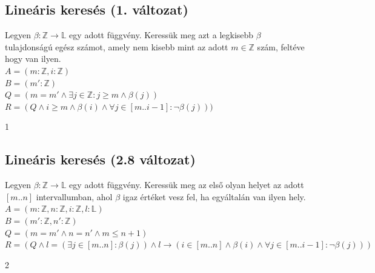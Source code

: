\documentclass[a4paper,12pt]{article}
\newcommand{\lv}{{:}}
\begin{document}
\subsection{Lineáris keresés (1. változat)}
Legyen $\beta\colon \mathbb{Z}\rightarrow\mathbb{L}$ egy adott függvény. Keressük meg azt a legkisebb $\beta$ tulajdonságú egész számot, amely nem kisebb mint az adott $m\in \mathbb{Z}$ szám, feltéve hogy van ilyen.\\

$A = (m\lv\mathbb{Z}, i\lv\mathbb{Z})$\\[2pt]
$B = (m'\lv\mathbb{Z})$\\[2pt]
$Q = (m = m' \land \exists j\in \mathbb{Z}\colon j\geqslant m \land \beta(j))$\\[2pt]
$R = (Q \land i\geqslant m \land \beta(i) \land \forall j \in [m..i-1]\colon \neg\beta(j)))$
\medskip
\begin{stuki}[4cm]
  \begin{WHILE}{1}{}
  \end{WHILE}
\end{stuki}
\bigskip

\subsection{Lineáris keresés (2.8 változat)}
Legyen $\beta\colon \mathbb{Z}\rightarrow\mathbb{L}$ egy adott függvény. Keressük meg az első olyan helyet az adott $[m..n]$ intervallumban, ahol $\beta$ igaz értéket vesz fel, ha egyáltalán van ilyen hely.\\

$A = (m\lv\mathbb{Z}, n\lv\mathbb{Z}, i\lv\mathbb{Z}, l\lv\mathbb{L})$\\[2pt]
$B = (m'\lv\mathbb{Z}, n'\lv\mathbb{Z})$\\[2pt]
$Q = (m = m' \land n = n' \land m \leqslant n+1)$\\[2pt]
$R = (Q \land l = (\exists j\in [m..n]\colon \beta(j)) \land l \rightarrow (i \in [m..n] \land \beta(i) \land \forall j \in [m..i-1]\colon \neg\beta(j)))$
\medskip
\begin{stuki}
  \begin{WHILE}{2}{}
  \end{WHILE}
\end{stuki}
\end{document}
